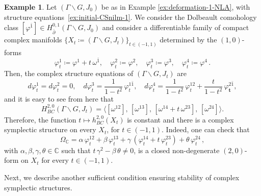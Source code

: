 \documentclass[a4paper]{amsart}
\theoremstyle{definition}
\newtheorem{example}[theorem]{Example}
\theoremstyle{remark}
\numberwithin{equation}{section}
\begin{document}
\begin{example}\label{ex:deformation1-BC-preserved}
Let $(\Gamma\backslash G,J_0)$ be as in Example \ref{ex:deformation-1-NLA}, with structure equations~\eqref{ex:initial-CSnilm-1}. We consider the Dolbeault comohology class $[\varphi^{\bar1}]\in H^{0,1}_{\bar{\partial}}(\Gamma\backslash G,J_0)$ and consider a differentiable family of compact complex manifolds $\big\{X_t\coloneqq(\Gamma\backslash G,J_t)\big\}_{t\in(-1,1)}$ determined by the $(1,0)$-forms
\[
\varphi_{t}^1\coloneqq\varphi^1+t\,\omega^{\bar1}, \quad 
\varphi_{t}^2\coloneqq\varphi^2,\quad
\varphi_{t}^3\coloneqq\varphi^3,\quad 
\varphi_{t}^4\coloneqq\varphi^4\,.
\]
Then, the complex structure equations of $(\Gamma\backslash G,J_t)$ are
\begin{equation}\label{ex:deformed-CSnilm-1-v2}
d\varphi_{t}^1=d\varphi_{t}^2=0, \quad 
d\varphi_{t}^3=\frac{1}{1-t^2}\,\varphi_{t}^{1\bar1}, \quad
d\varphi_{t}^4=\frac{1}{1-t^2}\,\varphi_{t}^{12}
+\frac{t}{1-t^2}\,\varphi_{\mathbf{t}}^{2\bar1},
\end{equation}
and it is easy to see from here that
$$H_{BC}^{2,0}(\Gamma\backslash G,J_t)=\langle [\omega^{12}],\,[\omega^{13}],\,[\omega^{14}+t\,\omega^{23}],\,[\omega^{24}]\rangle.$$
Therefore, the function $t\mapsto h^{2,0}_{BC}(X_t)$ is constant and there is a complex symplectic structure on every $X_t$, for $t\in(-1,1)$. Indeed, one can check that 
\[
\Omega_{\mathbb C}=\alpha\,\varphi_{t}^{12}
	+\beta\,\varphi_{t}^{13}+\gamma\,(\varphi_{t}^{14}
	+t\,\varphi_t^{23})+\theta\,\varphi_t^{24}\,,
\]
with $\alpha,\beta,\gamma,\theta\in\mathbb C$ such that $t\,\gamma^2-\beta\,\theta\neq 0$, is a closed non-degenerate $(2,0)$-form on $X_t$ for every $t\in(-1,1)$.
\end{example}


Next, we describe another sufficient condition ensuring stability of complex symplectic structures.

\medskip
\end{document}
